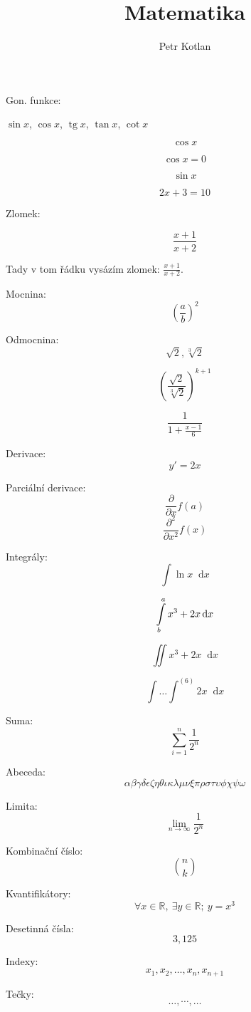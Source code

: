 \documentclass[a4paper, 12pt]{article}
\title{Matematika}
\author{Petr Kotlan}
\date{}
\newcommand*\diff{\mathop{}\!\mathrm{d}}
\DeclareMathOperator{\tg}{tg}
\begin{document}
\maketitle


Gon. funkce:

$\sin{x}$, $\cos{x}$, $\tg{x}$, $\tan{x}$, $\cot{x}$

$$ \cos{x} $$

\begin{equation*}
    \cos{x} = 0
\end{equation*}


\begin{equation}
    \sin{x}
\end{equation}

\begin{equation}
    2x + 3 = 10
\end{equation}

Zlomek:

\begin{equation}
    \frac{x + 1}{x + 2}
\end{equation}

Tady v tom řádku vysázím zlomek: $\frac{x + 1}{x + 2}$.

Mocnina:
$$ \left(\frac{a}{b}\right)^2 $$

Odmocnina:
$$ \sqrt{2}, \sqrt[3]{2} $$

$$ \left(
    \frac{\sqrt{2}}{\sqrt[3]{2}}
    \right)^{k + 1} $$

$$ \frac{1}{1 + \frac{x - 1}{6}} $$

Derivace:
$$ y'=2x $$

Parciální derivace:
$$ \frac{\partial}{\partial x} f(a)$$
$$ \frac{\partial^2}{\partial x^2} f(x)$$

Integrály:
$$ \int \ln{x} \diff{x} $$

$$ \int_{b}^{a}\limits x^3 + 2x \diff{x} $$  %

$$ \iint x^3 + 2x \diff{x} $$

$$ \int \dots \int^{(6)} 2x \diff{x} $$


Suma:
$$ \sum_{i=1}^{n}  \frac{1}{2^n} $$

Abeceda:
$$ \alpha \beta \gamma \delta \epsilon \zeta \eta \theta \iota \kappa \lambda \mu \nu \xi \pi \rho \sigma \tau \upsilon \phi \chi \psi \omega  $$

Limita:
$$ \lim_{n \to \infty} \frac{1}{2^n} $$

Kombinační číslo:
$$ \binom{n}{k} $$

Kvantifikátory:
$$ \forall{x} \in \mathbb{R},\ \exists{y} \in \mathbb{R}; \ y = x ^ 3$$

Desetinná čísla:
$$ 3{,}125 $$

Indexy:
$$ x_1, x_2, \dots, x_n, x_{n+1} $$

Tečky:
$$ \dots, \cdots, \ldots $$
\end{document}
